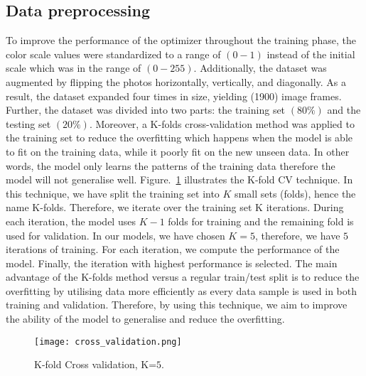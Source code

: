 \subsection{Data preprocessing}
To improve the performance of the optimizer throughout the training phase, the color scale values were standardized to a range of \((0-1)\) instead of the initial scale which was in the range of \((0 - 255)\).
Additionally, the dataset was augmented by flipping the photos horizontally, vertically, and diagonally.
As a result, the dataset expanded four times in size, yielding (1900) image frames.
Further, the dataset was divided into two parts: the training set $(80\%)$ and the testing set $(20\%)$.
Moreover, a K-folds cross-validation method was applied to the training set to reduce the overfitting which happens when the model is able to fit on the training data, while it poorly fit on the new unseen data.
In other words, the model only learns the patterns of the training data therefore the model will not generalise well. 
Figure.~\ref{fig:Cross_validation} illustrates the K-fold CV technique.
In this technique, we have split the training set into \(K\) small sets (folds), hence the name K-folds. 
Therefore, we iterate over the training set K iterations.
During each iteration, the model uses  \(K-1\) folds for training and the remaining fold is used for validation. 
In our models, we have chosen \(K=5\), therefore, we have \(5\) iterations of training. 
For each iteration, we compute the performance of the model.
Finally, the iteration with highest performance is selected.
The main advantage of the K-folds method versus a regular train/test split is to reduce the overfitting by utilising data more efficiently as every data sample is used in both training and validation. 
Therefore, by using this technique, we aim to improve the ability of the model to generalise and reduce the overfitting.
\begin{figure}
	\centering
	\texttt{[image: cross\_validation.png]}
	\caption{K-fold Cross validation, K=\(5\).}
	\label{fig:Cross_validation}
\end{figure}

